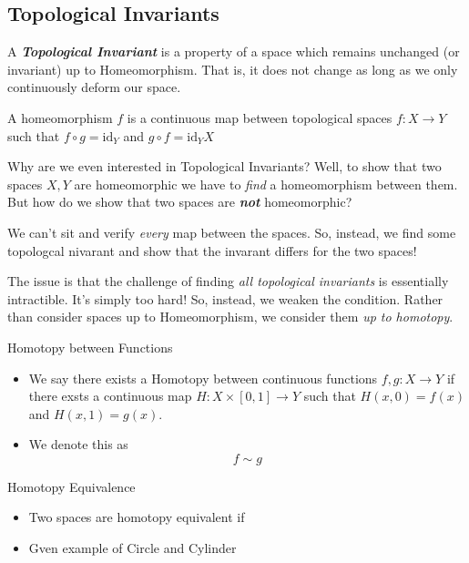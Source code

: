 \documentclass{article}
\begin{document}
\subsection{Topological Invariants}
A \emph{\textbf{Topological Invariant}} is a property of a space which remains unchanged (or invariant) up to Homeomorphism. That is, it does not change as long as we only continuously deform our space.

\begin{mathdefinitionbox}{}
  A homeomorphism $f$ is a continuous map between topological spaces $f : X \rightarrow Y$ such that $f \circ g = \mathrm{id}_Y$ and $g \circ f = \mathrm{id}_YX$
\end{mathdefinitionbox}

\vskip 0.25cm
Why are we even interested in Topological Invariants? Well, to show that two spaces $X, Y$ are homeomorphic we have to \emph{find} a homeomorphism between them. But how do we show that two spaces are \emph{\textbf{not}} homeomorphic? 

\vskip 0.25cm
We can't sit and verify \emph{every} map between the spaces. So, instead, we find some topologcal nivarant and show that the invarant differs for the two spaces!

\vskip 0.25cm
The issue is that the challenge of finding \emph{all topological invariants} is essentially intractible. It's simply too hard! So, instead, we weaken the condition. Rather than consider spaces up to Homeomorphism, we consider them \emph{up to homotopy}.

\begin{mathdefinitionbox}{Homotopy between Functions}
  \vskip 0.25cm
  \begin{itemize}
    \item We say there exists a Homotopy between continuous functions $f, g : X \rightarrow Y$ if there exsts a continuous map $H : X \times [0,1] \rightarrow Y$ such that $H(x, 0) = f(x)$ and $H(x, 1) = g(x)$.
    \item We denote this as 
    \[ f \sim g \]
  \end{itemize}
\end{mathdefinitionbox}

\begin{mathdefinitionbox}{Homotopy Equivalence}
  \begin{itemize}
    \item Two spaces are homotopy equivalent if
    \item Gven example of Circle and Cylinder
  \end{itemize}
\end{mathdefinitionbox}
\end{document}
